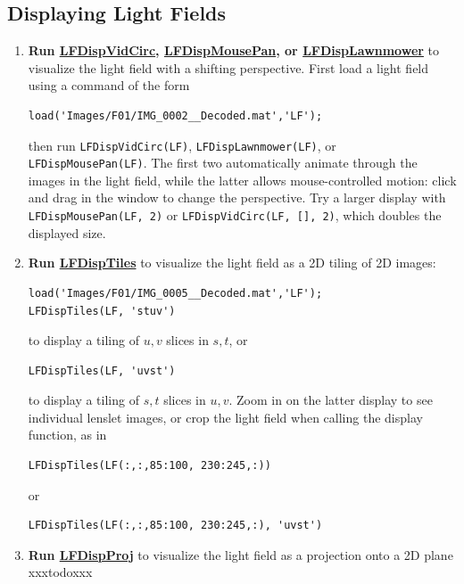 \documentclass[onecolumn]{article}
\newcommand{\CiteFunction}[1]{\hyperlink{#1}{\small #1}}
\newcommand{\SymbolText}[1]{\texttt{\small #1}}
\begin{document}
\subsection{Displaying Light Fields}
\label{sect_DisplayingTour}
\begin{enumerate}[leftmargin=1.5em,rightmargin=0.5cm]
\item \textbf{Run \CiteFunction{LFDispVidCirc}, \CiteFunction{LFDispMousePan}, or \CiteFunction{LFDispLawnmower}} to visualize the light field with a shifting perspective. First load a light field using a command of the form
\begin{Verbatim}
load('Images/F01/IMG_0002__Decoded.mat','LF');
\end{Verbatim}
then run \SymbolText{LFDispVidCirc(LF)}, \SymbolText{LFDispLawnmower(LF)}, or \SymbolText{LFDispMousePan(LF)}. The first two automatically animate through the images in the light field, while the latter allows mouse-controlled motion: click and drag in the window to change the perspective.  Try a larger display with \SymbolText{LFDispMousePan(LF, 2)} or \SymbolText{LFDispVidCirc(LF, [], 2)}, which doubles the displayed size.

\item \textbf{Run \CiteFunction{LFDispTiles}} to visualize the light field as a 2D tiling of 2D images:
\begin{Verbatim}
load('Images/F01/IMG_0005__Decoded.mat','LF');
LFDispTiles(LF, 'stuv')
\end{Verbatim}
to display a tiling of $u,v$ slices in $s,t$, or
\begin{Verbatim}
LFDispTiles(LF, 'uvst')
\end{Verbatim}
to display a tiling of $s,t$ slices in $u,v$. Zoom in on the latter display to see individual lenslet images, or crop the light field when calling the display function, as in
\begin{Verbatim}
LFDispTiles(LF(:,:,85:100, 230:245,:))
\end{Verbatim}
or
\begin{Verbatim}
LFDispTiles(LF(:,:,85:100, 230:245,:), 'uvst')
\end{Verbatim}

\item \textbf{Run \CiteFunction{LFDispProj}} to visualize the light field as a projection onto a 2D plane
xxxtodoxxx

\end{enumerate}

\end{document}

